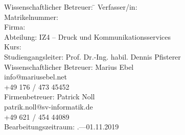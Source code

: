 \begin{titlepage}
\begin{center}
\begin{minipage}{\textwidth}
\begin{tabbing}
	Wissenschaftlicher Betreuer: \hspace{0.85cm}\=\kill
	Verfasser/in: \> \DerAutorDerArbeit \\[1.5mm]
	Matrikelnummer:  \\[1.5mm]
	Firma: \> \DerNameDerFirma  \\[1.5mm]
	Abteilung: \> IZ4 -- Druck und Kommunikationsservices \\[1.5mm]
	Kurs: \> \DieKursbezeichnung \\[1.5mm]
	Studiengangsleiter: \> Prof. Dr.-Ing. habil. Dennis Pfisterer \\[1.5mm]
	Wissenschaftlicher Betreuer: \> Marius Ebel \\
	\> info@mariusebel.net \\
	\> +49 176 / 473 45452 \\[1.5mm]
	Firmenbetreuer: \> Patrick Noll \\
	\> patrik.noll@sv-informatik.de \\
	\> +49 621 / 454 44089 \\[1.5mm]
	Bearbeitungszeitraum: .---01.11.2019
\end{tabbing}
\end{minipage}

\end{center}

\end{titlepage}